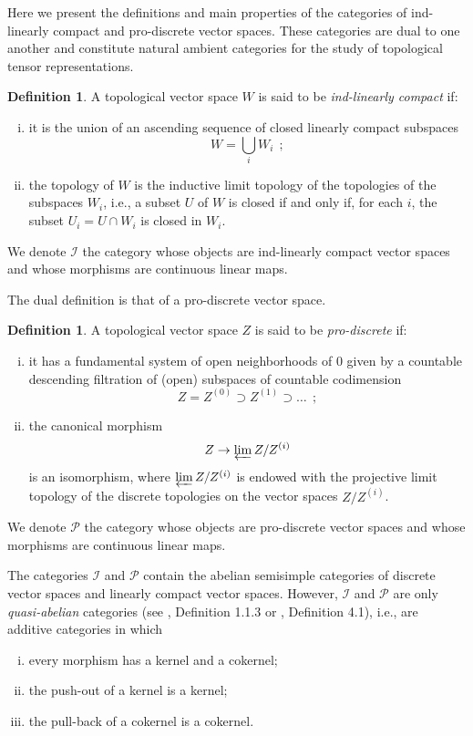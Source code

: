 \documentclass[12pt,reqno]{amsart}
\theoremstyle{definition}
\newtheorem{defn}[thm]{Definition}
\theoremstyle{remark}
\begin{document}
    
    Here we present the definitions and main properties of the categories of ind-linearly compact and pro-discrete vector spaces. These categories are dual to one another and constitute natural ambient categories for the study of topological tensor representations.
	
	\begin{defn}
	    A topological vector space $W$ is said to be \emph{ind-linearly compact} if:
	    \begin{enumerate}[(i)]
	        \item it is the union of an ascending sequence of closed linearly compact subspaces
	        $$
	        W = \bigcup_i W_i \ \ ;
	        $$
	        \item the topology of $W$ is the inductive limit topology of the topologies of the subspaces $W_i$, i.e., a subset $U$ of $W$ is closed if and only if, for each $i$, the subset $U_i = U \cap W_i$ is closed in $W_i$.
	    \end{enumerate}
	    We denote $\mathcal{I}$ the category whose objects are ind-linearly compact vector spaces and whose morphisms are continuous linear maps.
	\end{defn}
	
	The dual definition is that of a pro-discrete vector space.
	
	\begin{defn}
	    A topological vector space $Z$ is said to be \emph{pro-discrete} if:
	    \begin{enumerate}[(i)]
	        \item it has a fundamental system of open neighborhoods of $0$ given by a countable descending filtration of (open) subspaces of countable codimension
	    $$
	    Z = Z^{(0)} \supset Z^{(1)} \supset \ldots \ \ ;
	    $$
	    \item the canonical morphism 
	    $$
	    Z \rightarrow \varprojlim Z/Z^{(i)}
	    $$
	    is an isomorphism, where $\varprojlim Z/Z^{(i)}$ is endowed with the projective limit topology of the discrete topologies on the  vector spaces $Z/Z^{(i)}$.
	    \end{enumerate}
	    
	    We denote $\mathcal{P}$ the category whose objects are pro-discrete vector spaces and whose morphisms are continuous linear maps.
	\end{defn}
	
	The categories $\mathcal{I}$ and $\mathcal{P}$ contain the abelian semisimple categories of discrete vector spaces and linearly compact vector spaces. However, $\mathcal{I}$ and $\mathcal{P}$ are only \emph{quasi-abelian} categories (see \cite{Schneiders}, Definition 1.1.3 or \cite{Buh}, Definition 4.1), i.e., are additive categories in which 
	\begin{enumerate}[(i)]
	    \item every morphism has a  kernel and a cokernel;
	    \item the push-out of a kernel is a kernel;
	    \item the pull-back of a cokernel is a cokernel.
	\end{enumerate}
	
\end{document}
